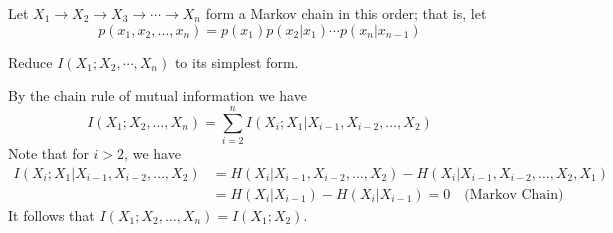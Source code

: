\begin{exercise}{Let $X_1 \rightarrow X_2\rightarrow  X_3 \rightarrow \cdots \rightarrow X_n$ form a Markov chain in this order; that is, let
  $$p\left(x_{1}, x_{2}, \ldots, x_{n}\right)=p\left(x_{1}\right) p\left(x_{2} | x_{1}\right) \cdots p\left(x_{n} | x_{n-1}\right)$$

  Reduce $I(X_1;X_2, \cdots , X_n)$ to its simplest form.
  }

  \begin{solution}
    By the chain rule of mutual information we have
    $$I\left(X_{1}; X_{2}, \ldots, X_{n}\right) =\sum_{i=2}^{n} I\left(X_{i} ;  X_1 | X_{i-1}, X_{i-2}, \ldots, X_{2}\right) $$
    Note that for $i>2$, we have
    \begin{equation}
      \begin{aligned}
        I\left(X_{i} ;  X_1 | X_{i-1}, X_{i-2}, \ldots, X_{2}\right) &= H\left(X_i|X_{i-1}, X_{i-2}, \ldots, X_{2}\right ) - H\left(X_i|X_{i-1}, X_{i-2}, \ldots, X_{2}, X_{1}\right ) \\
        &= H(X_i|X_{i-1}) - H(X_i|X_{i-1}) = 0 \quad \text{(Markov Chain)}
      \end{aligned}
    \end{equation}
    It follows that $I\left(X_{1}; X_{2}, \ldots, X_{n}\right) =  I\left(X_{1} ;  X_2 \right) $.


  \end{solution}
\end{exercise}


